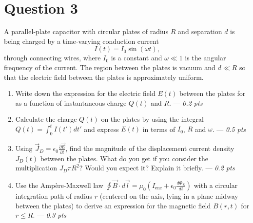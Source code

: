 \section*{Question 3}
\begin{minipage}{0.5\textwidth}
A parallel‑plate capacitor with circular plates of radius $R$ and separation $d$ is being charged by a time‑varying conduction current
\[
I(t) = I_0 \sin(\omega t) \text{,}
\]
through connecting wires, where $I_0$ is a constant and $\omega \ll 1$ is the angular frequency of the current. The region between the plates is vacuum and $d \ll R$ so that the electric field between the plates is approximately uniform.
\end{minipage}
\begin{minipage}{0.5\textwidth}
    \centering
\end{minipage}
\begin{enumerate}
    \item[(a)] Write down the expression for the electric field $E(t)$ between the plates for as a function of instantaneous charge $Q(t)$ and $R$. --- \textit{0.2 pts}
    \item[(b)] Calculate the charge $Q(t)$ on the plates by using the integral $Q(t) = \int_0^t I(t') dt'$ and express $E(t)$ in terms of $I_0$, $R$ and $\omega$. --- \textit{0.5 pts} 
    \item[(c)] Using $\vec{J}_D=\epsilon_0 \frac{\partial \vec{E}}{\partial t}$, find the magnitude of the displacement current density $J_D(t)$ between the plates. What do you get if you consider the multiplication $J_D \pi R^2$? Would you expect it? Explain it briefly. --- \textit{0.2 pts}
    \item[(d)] Use the Ampère-Maxwell law $\oint \vec{B} \cdot d\vec{l} = \mu_0 \left( I_\text{enc} + \epsilon_0 \frac{d\Phi_E}{dt} \right)$ with a circular integration path of radius $r$ (centered on the axis, lying in a plane midway between the plates) to derive an expression for the magnetic field $B(r,t)$ for $r \leq R$. --- \textit{0.3 pts}
\end{enumerate}

